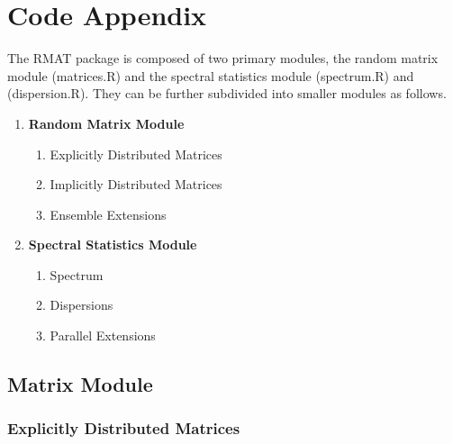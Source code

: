 
\chapter{Code Appendix}


\noindent
The RMAT package is composed of two primary modules, the random matrix module (matrices.R) and the spectral statistics module (spectrum.R) and (dispersion.R). They can be further subdivided into smaller modules as follows.

\begin{enumerate}
  \item \textbf{Random Matrix Module}
    \begin{enumerate}
      \item Explicitly Distributed Matrices
      \item Implicitly Distributed Matrices
      \item Ensemble Extensions
    \end{enumerate}

  \item \textbf{Spectral Statistics Module}
    \begin{enumerate}
      \item Spectrum
      \item Dispersions
      \item Parallel Extensions
    \end{enumerate}
\end{enumerate}

\newpage
\section{Matrix Module}

\subsection{Explicitly Distributed Matrices}

